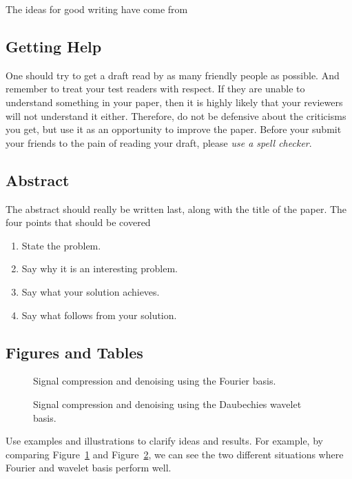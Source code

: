 \documentclass[10pt,conference,compsocconf]{IEEEtran}
\begin{document}
The ideas for good writing have come
from~

\subsection{Getting Help}
One should try to get a draft read by as many friendly people as
possible. And remember to treat your test readers with respect. If
they are unable to understand something in your paper, then it is
highly likely that your reviewers will not understand it
either. Therefore, do not be defensive about the criticisms you get,
but use it as an opportunity to improve the paper. Before your submit
your friends to the pain of reading your draft, please \emph{use a
  spell checker}.

\subsection{Abstract}
The abstract should really be written last, along with the title of
the paper. The four points that should be covered~
\begin{enumerate}
\item State the problem.
\item Say why it is an interesting problem.
\item Say what your solution achieves.
\item Say what follows from your solution.
\end{enumerate}

\subsection{Figures and Tables}

\begin{figure}[tbp]
  \centering
  \caption{Signal compression and denoising using the Fourier basis.}
  \vspace{-3mm}
  \label{fig:denoise-fourier}
\end{figure}
\begin{figure}[htbp]
  \centering
  \vspace{-3mm}
  \caption{Signal compression and denoising using the Daubechies wavelet basis.}
  \label{fig:denoise-wavelet}
\end{figure}

Use examples and illustrations to clarify ideas and results. For
example, by comparing Figure~\ref{fig:denoise-fourier} and
Figure~\ref{fig:denoise-wavelet}, we can see the two different
situations where Fourier and wavelet basis perform well. 
\end{document}
